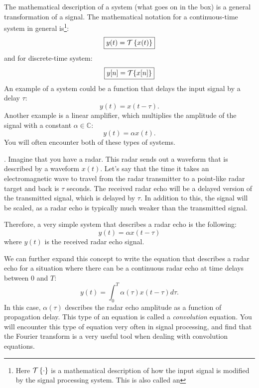 The mathematical description of a system (what goes on in the box) is a general transformation of a signal. The mathematical notation for a continuous-time system in general is\footnote{Here $\spop$ is a mathematical description of how the input signal is modified by the signal processing system. This is also called an
}:
\begin{equation}
\boxed{
y(t) = \spop[x(t)]
}
\end{equation}
and for discrete-time system:
\begin{equation}
\boxed{
y[n] = \spopb\{x[n]\}
}
\end{equation}
An example of a system could be a function that delays the input
signal by a delay $\tau$:
\begin{equation}
y(t) = x(t-\tau).
\end{equation}
Another example is a linear amplifier, which multiplies the amplitude
of the signal with a constant $\alpha \in \mathbb{C}$:
\begin{equation}
y(t) = \alpha x(t).
\end{equation}
You will often encounter both of these types of systems.

. Imagine that you have a radar. This radar sends out a waveform that is described by a waveform $x(t)$. Let's say that the
time it takes an electromagnetic wave to travel from the radar transmitter to a point-like radar target and back is $\tau$ seconds. The received radar echo will be a delayed version of the transmitted signal, which is delayed by $\tau$. In addition to this, the signal will be scaled, as a radar echo is typically much weaker than the transmitted signal.

Therefore, a very simple system that describes a radar echo is the following:
\begin{equation}
y(t) = \alpha x(t-\tau)
\end{equation}
where $y(t)$ is the received radar echo signal.

We can further expand this concept to write the equation that describes a radar echo for a situation where there can be a continuous radar echo at time delays between $0$ and $T$:
\begin{equation}
y(t) = \int_0^T \alpha(\tau) x(t-\tau) d\tau.
\end{equation}
In this case, $\alpha(\tau)$ describes the radar echo amplitude as a function of propagation delay. This type of an equation is called a \emph{convolution} equation. You will encounter this type of equation very often in signal processing, and find that the Fourier transform is a very useful tool when dealing with convolution equations.

